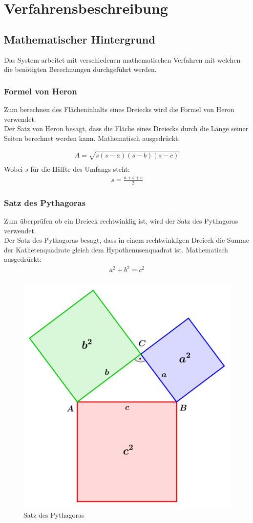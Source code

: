 \chapter{Verfahrensbeschreibung}\label{ch:verfahrensbeschreibung}


\section{Mathematischer Hintergrund}\label{sec:mathematischer_hintergrund}
Das System arbeitet mit verschiedenen mathematischen Verfahren mit welchen die benötigten Berechnungen durchgeführt werden.

\subsection{Formel von Heron}\label{subsec:formel_von_heron}
Zum berechnen des Flächeninhalts eines Dreiecks wird die Formel von Heron verwendet.
\\
Der Satz von Heron besagt, dass die Fläche eines Dreiecks durch die Länge seiner Seiten berechnet werden kann. Mathematisch ausgedrückt:

\begin{align}
    A=\sqrt{s(s-a)(s-b)(s-c)}\\
\end{align}
Wobei $s$ für die Hälfte des Umfangs steht:
\begin{align}
    s=\frac{a+b+c}{2}
\end{align}

\pagebreak
\subsection{Satz des Pythagoras}\label{subsec:satz_des_pythagoras}
Zum überprüfen ob ein Dreieck rechtwinklig ist, wird der Satz des Pythagoras verwendet.
\\
Der Satz des Pythagoras besagt, dass in einem rechtwinkligen Dreieck die Summe der Kathetenquadrate gleich dem Hypothenusenquadrat ist. Mathematisch ausgedrückt:
\begin{align}
    a^2+b^2=c^2\\
\end{align}
\begin{figure}
    \centering
    \includegraphics[width=0.5\linewidth]{images/pythagoras.png}
    \caption{Satz des Pythagoras}
    \label{fig:pythagoras}
\end{figure}
